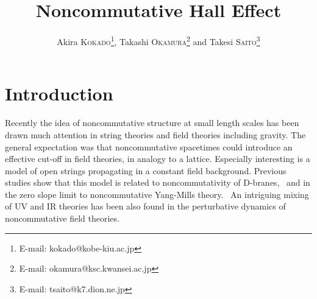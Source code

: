 \documentclass[a4paper,seceq]{ptptex}
\title{%
Noncommutative Hall Effect
}
\author{%
    Akira \textsc{Kokado}\myHighlight{$^{1,}$}\coordHE{}\footnote{
                         E-mail: kokado@kobe-kiu.ac.jp},
    Takashi \textsc{Okamura}\myHighlight{$^{2,}$}\coordHE{}\footnote{
                         E-mail: okamura@ksc.kwansei.ac.jp}
and Takesi \textsc{Saito}\myHighlight{$^{3,}$}\coordHE{}\footnote{
                         E-mail: tsaito@k7.dion.ne.jp}
}
\begin{document}
\maketitle
\section{Introduction}
Recently the idea of noncommutative structure at small length scales
has been drawn much attention in string theories and
field theories including gravity.
The general expectation was that noncommutative spacetimes could
introduce an effective cut-off in field theories,
in analogy to a lattice. 
Especially interesting is a model of open strings propagating
in a constant \coordHE{} field background.
Previous studies show that this model is related to
noncommutativity of D-branes,
\cite{rf:1} \ 
and in the zero slope limit
to noncommutative Yang-Mills theory.
\cite{rf:2} \ 
An intriguing mixing of UV and IR theories has been also found
in the perturbative dynamics of noncommutative field theories.
\cite{rf:3}
\end{document}
